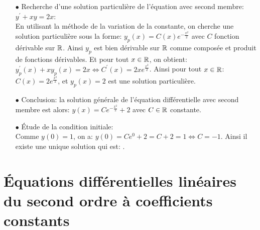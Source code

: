 \documentclass[a4paper, 11pt,reqno]{article}
\begin{document}
\begin{correction}
\begin{enumerate}
\begin{itemize}
\begin{itemize}
\end{itemize}
\item[$\bullet$] Recherche d'une solution particuli\`{e}re de l'\'equation avec second membre: $y^{\prime}+xy=2x$:\\
\noindent En utilisant la m\'ethode de la variation de la constante, on cherche une solution particuli\`{e}re sous la forme: $y_p(x)= C(x) e^{-\frac{x^2}{2}}$ avec $C$ fonction d\'erivable sur $\mathbb{R}$. Ainsi $y_p$ est bien d\'erivable sur $\mathbb{R}$ comme compos\'ee et produit de fonctions d\'erivables. Et pour tout $x\in\mathbb{R}$, on obtient: $y^{\prime}_p(x)+xy_p(x)=2x\Leftrightarrow C^{\prime}(x)=2xe^{\frac{x^2}{2}}$. Ainsi pour tout $x\in\mathbb{R}$: $C(x)=2e^{\frac{x^2}{2}}$, et $y_p(x)= 2$ est une solution particuli\`{e}re.
\item[$\bullet$] Conclusion: la solution g\'en\'erale de l'\'equation diff\'erentielle avec second membre est alors: $y(x)= Ce^{-\frac{x^2}{2}}+2$ avec $C\in\mathbb{R}$ constante.
\item[$\bullet$] \'Etude de la condition initiale:\\
\noindent Comme $y(0)=1$, on a: $y(0)=Ce^{0}+2=C+2=1\Leftrightarrow C=-1.$ Ainsi il existe une unique solution qui est: .
\end{itemize}
\end{enumerate}
\end{correction}
\vspace{0.4cm}


\noindent \section{{\bf\Large{\'Equations diff\'erentielles lin\'eaires du second ordre \`{a} coefficients constants}}}
\vspace{0.2cm}
\end{document}

